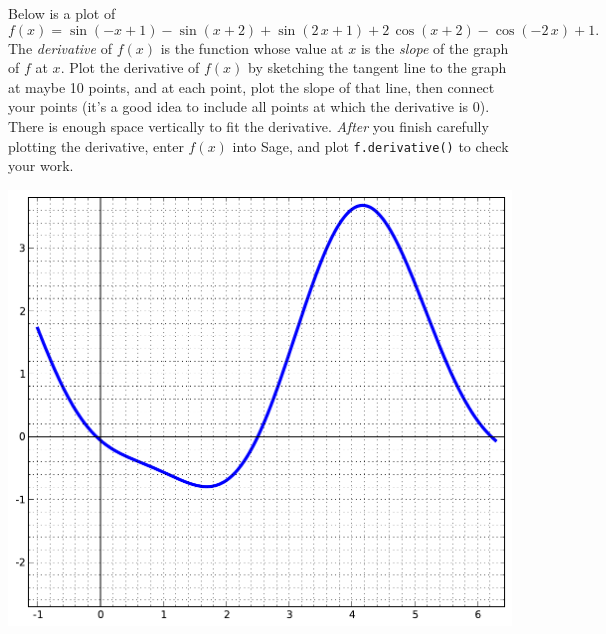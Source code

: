Below is a plot of $$f(x)=\sin\left(-x + 1\right) - \sin\left(x + 2\right) + \sin\left(2 \, x + 1\right) + 2 \, \cos\left(x + 2\right) - \cos\left(-2 \, x\right) + 1.$$  The {\em \color{red}derivative} of $f(x)$ is the function whose value at $x$ is the {\em slope} of the graph of $f$ at $x$.  Plot the derivative of $f(x)$ by sketching the tangent line to the graph at maybe 10 points, and at each point, plot the slope of that line, then connect your points (it's a good idea to include all points at which the derivative is 0).  There is enough space vertically to fit the derivative.  {\em After} you finish carefully plotting the derivative, enter $f(x)$ into Sage, and plot {\color{blue}\verb|f.derivative()|} to check your work.
\begin{center}\includegraphics{functions/59.pdf}\end{center}\newpage

